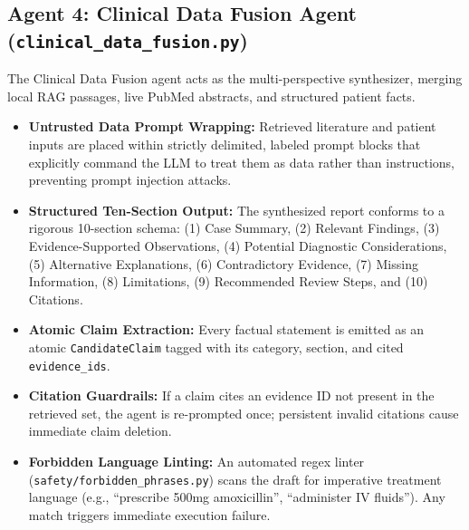 \documentclass[12pt,a4paper]{report}
\begin{document}
\subsection{Agent 4: Clinical Data Fusion Agent (\texttt{clinical\_data\_fusion.py})}
The Clinical Data Fusion agent acts as the multi-perspective synthesizer, merging local RAG passages, live PubMed abstracts, and structured patient facts.
\begin{itemize}
    \item \textbf{Untrusted Data Prompt Wrapping:} Retrieved literature and patient inputs are placed within strictly delimited, labeled prompt blocks that explicitly command the LLM to treat them as data rather than instructions, preventing prompt injection attacks.
    \item \textbf{Structured Ten-Section Output:} The synthesized report conforms to a rigorous 10-section schema: (1) Case Summary, (2) Relevant Findings, (3) Evidence-Supported Observations, (4) Potential Diagnostic Considerations, (5) Alternative Explanations, (6) Contradictory Evidence, (7) Missing Information, (8) Limitations, (9) Recommended Review Steps, and (10) Citations.
    \item \textbf{Atomic Claim Extraction:} Every factual statement is emitted as an atomic \texttt{CandidateClaim} tagged with its category, section, and cited \texttt{evidence\_ids}.
    \item \textbf{Citation Guardrails:} If a claim cites an evidence ID not present in the retrieved set, the agent is re-prompted once; persistent invalid citations cause immediate claim deletion.
    \item \textbf{Forbidden Language Linting:} An automated regex linter (\texttt{safety/forbidden\_phrases.py}) scans the draft for imperative treatment language (e.g., ``prescribe 500mg amoxicillin'', ``administer IV fluids''). Any match triggers immediate execution failure.
\end{itemize}
\end{document}

